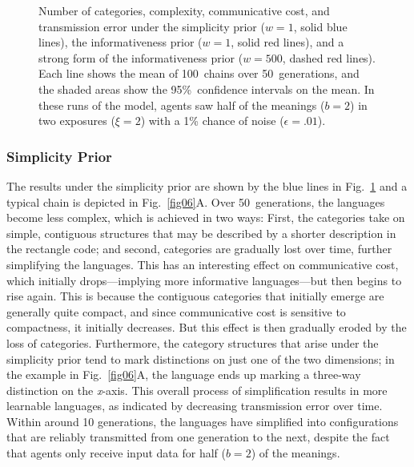 \documentclass[doc,biblatex]{apa7}
\begin{document}
	\begin{figure}
	\vspace*{2pt}
	\caption{Number of categories, complexity, communicative cost, and transmission error under the simplicity prior ($w=1$, solid blue lines), the informativeness prior ($w=1$, solid red lines), and a strong form of the informativeness prior ($w=500$, dashed red lines). Each line shows the mean of 100~chains over 50~generations, and the shaded areas show the 95\%~confidence intervals on the mean. In these runs of the model, agents saw half of the meanings ($b=2$) in two exposures ($\xi=2$) with a 1\% chance of noise ($\epsilon=.01$).}
	\label{fig05}
	\end{figure}

\subsubsection{Simplicity Prior}

The results under the simplicity prior are shown by the blue lines in Fig.~\ref{fig05} and a typical chain is depicted in Fig.~\ref{fig06}A. Over 50~generations, the languages become less complex, which is achieved in two ways: First, the categories take on simple, contiguous structures that may be described by a shorter description in the rectangle code; and second, categories are gradually lost over time, further simplifying the languages. This has an interesting effect on communicative cost, which initially drops---implying more informative languages---but then begins to rise again. This is because the contiguous categories that initially emerge are generally quite compact, and since communicative cost is sensitive to compactness, it initially decreases. But this effect is then gradually eroded by the loss of categories. Furthermore, the category structures that arise under the simplicity prior tend to mark distinctions on just one of the two dimensions; in the example in Fig.~\ref{fig06}A, the language ends up marking a three-way distinction on the \textit{x}-axis. This overall process of simplification results in more learnable languages, as indicated by decreasing transmission error over time. Within around 10 generations, the languages have simplified into configurations that are reliably transmitted from one generation to the next, despite the fact that agents only receive input data for half ($b=2$) of the meanings.
\end{document}
